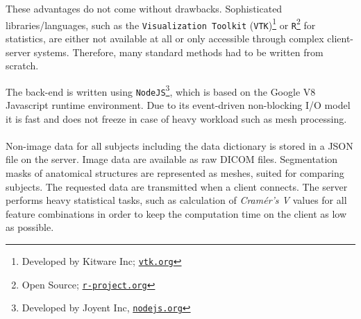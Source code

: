 \documentclass[journal]{style/vgtc} 			          %
\newcommand{\rem}[1]{\textcolor{red}{\sout{#1}}}
\begin{document}
These advantages do not come without drawbacks.
%
Sophisticated libraries/languages, such as the \texttt{Visualization Toolkit} (\texttt{VTK})\footnote{Developed by Kitware Inc; \href{http://vtk.org}{\texttt{vtk.org}}} or \texttt{R}\footnote{Open Source; \href{http://r-project.org}{\texttt{r-project.org}}} for statistics, are either not available at all or only accessible through complex client-server systems.
%
Therefore, many standard methods had to be written from scratch.
%
%

The back-end is written using \texttt{NodeJS}\footnote{Developed by Joyent Inc, \href{http://nodejs.org}{\texttt{nodejs.org}}}, which is based on the Google V8 Javascript runtime environment.
%
Due to its event-driven non-blocking I/O model it is fast and does not freeze in case of heavy workload such as mesh processing.
\\\\
Non-image data for all subjects including the data dictionary is stored in a JSON file on the server.
%
Image data are available as raw DICOM files.
%
Segmentation masks of anatomical structures are represented as meshes, suited for comparing subjects.
%
The requested data are transmitted when a client connects.
%
The server performs heavy statistical tasks, such as calculation of \emph{Cram\'{e}r's V} values for all feature combinations in order to keep the computation time on the client as low as possible.
%
\end{document}
